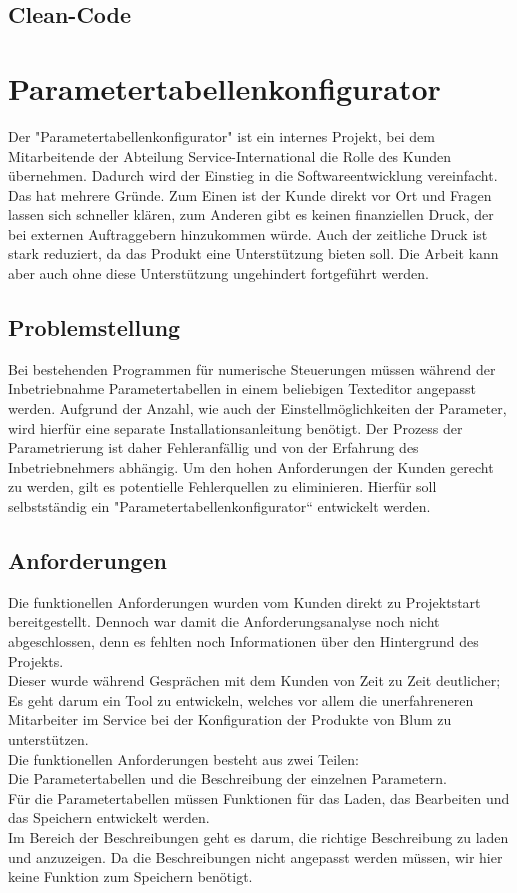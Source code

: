 \documentclass[a4paper,12pt,top=2.5cm,bottom=2.5cm, left=2.5cm, right=2.5cm, numbers=noenddot]{scrartcl}
\begin{document}
\subsection{Clean-Code}
\label{Clean-Code} 
\section{Parametertabellenkonfigurator}
Der "Parametertabellenkonfigurator" ist ein internes Projekt, bei dem Mitarbeitende der Abteilung Service-International die Rolle des Kunden übernehmen. Dadurch wird der Einstieg in die Softwareentwicklung vereinfacht. \\
Das hat mehrere Gründe. Zum Einen ist der Kunde direkt vor Ort und Fragen lassen sich schneller klären, zum Anderen gibt es keinen finanziellen Druck, der bei externen Auftraggebern hinzukommen würde. Auch der zeitliche Druck ist stark reduziert, da das Produkt eine Unterstützung bieten soll. Die Arbeit kann aber auch ohne diese Unterstützung ungehindert fortgeführt werden.
\subsection{Problemstellung}
Bei bestehenden Programmen für numerische Steuerungen müssen während der Inbetriebnahme Parametertabellen in einem beliebigen Texteditor angepasst werden. Aufgrund der Anzahl, wie auch der Einstellmöglichkeiten der Parameter, wird hierfür eine separate Installationsanleitung benötigt. Der Prozess der Parametrierung ist daher Fehleranfällig und von der Erfahrung des Inbetriebnehmers abhängig. Um den hohen Anforderungen der Kunden gerecht zu werden, gilt es potentielle Fehlerquellen zu eliminieren. Hierfür soll selbstständig ein "Parametertabellenkonfigurator“ entwickelt werden.
\subsection{Anforderungen}
Die funktionellen Anforderungen wurden vom Kunden direkt zu Projektstart bereitgestellt. Dennoch war damit die Anforderungsanalyse noch nicht abgeschlossen, denn es fehlten noch Informationen über den Hintergrund des Projekts. \\
Dieser wurde während Gesprächen mit dem Kunden von Zeit zu Zeit deutlicher; Es geht darum ein Tool zu entwickeln, welches vor allem die unerfahreneren Mitarbeiter im Service bei der Konfiguration der Produkte von Blum zu unterstützen.\\
Die funktionellen Anforderungen besteht aus zwei Teilen: \\
Die Parametertabellen und die Beschreibung der einzelnen Parametern.\\
Für die Parametertabellen müssen Funktionen für das Laden, das Bearbeiten und das Speichern entwickelt werden.\\
Im Bereich der Beschreibungen geht es darum, die richtige Beschreibung zu laden und anzuzeigen. Da die Beschreibungen nicht angepasst werden müssen, wir hier keine Funktion zum Speichern benötigt.
\end{document}
